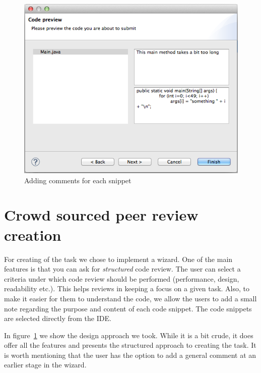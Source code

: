 \documentclass{sigchi}
\begin{document}
\begin{figure}[hbt]
	\includegraphics[width=\columnwidth]{wizard.png}
\caption{Adding comments for each snippet}
\label{fig:wizard}
\end{figure}
 
\section{Crowd sourced peer review creation}

For creating of the task we chose to implement a wizard. One of the main features is that you can ask
for \emph{structured} code review. The user can select a criteria under which code review should be
performed (performance, design, readability etc.). This helps reviews in keeping a focus on a given task.
Also, to make it easier for them to understand the code, we allow the users to add a small note regarding
the purpose and content of each code snippet. The code snippets are selected directly from the IDE.

In figure~\ref{fig:wizard} we show the design approach we took. While it is a bit crude, it does offer all
the features and presents the structured approach to creating the task. It is worth mentioning that the user
has the option to add a general comment at an earlier stage in the wizard.
\end{document}
